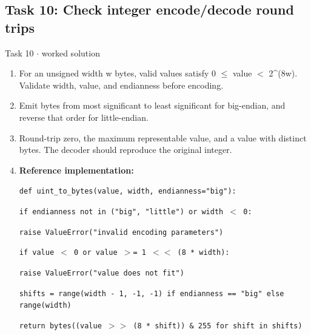 \documentclass[11pt]{article}
\begin{document}
\begin{keepsection}\subsection{Task 10: Check integer encode/decode round trips}

\begin{workedbox}{Task 10 \ensuremath{\cdot} worked solution}
\begin{enumerate}
\item For an unsigned width w bytes, valid values satisfy 0 \ensuremath{\leq} value \ensuremath{<} 2\textasciicircum{}(8w). Validate width, value, and endianness before encoding.
\item Emit bytes from most significant to least significant for big-endian, and reverse that order for little-endian.
\item Round-trip zero, the maximum representable value, and a value with distinct bytes. The decoder should reproduce the original integer.
\item {}
\textbf{Reference implementation:}
\begin{tcolorbox}[colback=Paperblue,colframe=Paperblue,boxrule=0pt,arc=0pt,left=7pt,right=7pt,top=5pt,bottom=5pt]\small\sloppy
\noindent\hspace*{0em}\texttt{def uint\_to\_bytes(value, width, endianness="big"):}\par
\noindent\hspace*{1em}\texttt{if endianness not in ("big", "little") or width \ensuremath{<} 0:}\par
\noindent\hspace*{3em}\texttt{raise ValueError("invalid encoding parameters")}\par
\noindent\hspace*{1em}\texttt{if value \ensuremath{<} 0 or value \ensuremath{>}= 1 \ensuremath{<}\ensuremath{<} (8 * width):}\par
\noindent\hspace*{3em}\texttt{raise ValueError("value does not fit")}\par
\noindent\hspace*{1em}\texttt{shifts = range(width - 1, -1, -1) if endianness == "big" else range(width)}\par
\noindent\hspace*{1em}\texttt{return bytes((value \ensuremath{>}\ensuremath{>} (8 * shift)) \& 255 for shift in shifts)}\par

\end{tcolorbox}
\end{enumerate}
\end{workedbox}
\end{keepsection}
\end{document}
